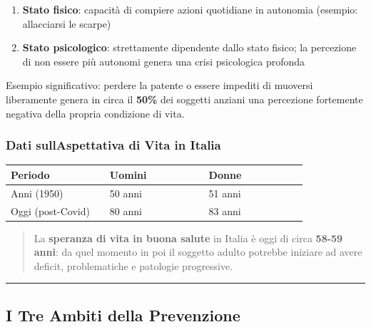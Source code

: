 \documentclass[a4paper,11pt]{article}
\providecommand{\tightlist}{%
  \setlength{\itemsep}{0pt}\setlength{\parskip}{0pt}}
\begin{document}
\begin{enumerate}
      \tightlist
      \item
            \textbf{Stato fisico}: capacità di compiere azioni quotidiane in
            autonomia (esempio: allacciarsi le scarpe)
      \item
            \textbf{Stato psicologico}: strettamente dipendente dallo stato
            fisico; la percezione di non essere più autonomi genera una crisi
            psicologica profonda
\end{enumerate}

Esempio significativo: perdere la patente o essere impediti di muoversi
liberamente genera in circa il \textbf{50\%} dei soggetti anziani una
percezione fortemente negativa della propria condizione di vita.

\subsubsection{Dati sull\textquotesingle Aspettativa di Vita in
      Italia}\label{dati-sullaspettativa-di-vita-in-italia}

\begin{longtable}[]{@{}p{0.30\linewidth}p{0.30\linewidth}p{0.30\linewidth}@{}}
      \toprule\noalign{}
      Periodo                        & Uomini  & Donne   \\
      \midrule\noalign{}
      \endhead
      \bottomrule\noalign{}
      \endlastfoot
      Anni \textquotesingle50 (1950) & 50 anni & 51 anni \\
      Oggi (post-Covid)              & 80 anni & 83 anni \\
\end{longtable}

\begin{quote}
      La \textbf{speranza di vita in buona salute} in Italia è oggi di circa
      \textbf{58-59 anni}: da quel momento in poi il soggetto adulto potrebbe
      iniziare ad avere deficit, problematiche e patologie progressive.
\end{quote}

\begin{center}\rule{0.5\linewidth}{0.5pt}\end{center}

\subsection{I Tre Ambiti della
      Prevenzione}\label{i-tre-ambiti-della-prevenzione}
\end{document}
